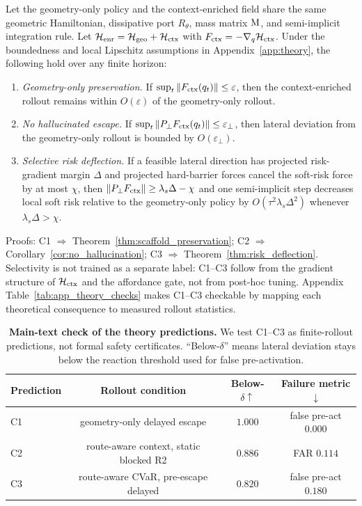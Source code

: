 \begin{proposition}
\label{prop:enrichment}
Let the geometry-only policy and the context-enriched field share the same geometric Hamiltonian, dissipative
port $R_\theta$, mass matrix $\mathrm{M}$, and semi-implicit integration rule.  Let
$\mathcal{H}_{\rm enr}=\mathcal{H}_{\rm geo}+\mathcal{H}_{\rm ctx}$ with
$F_{\rm ctx}=-\nabla_q\mathcal{H}_{\rm ctx}$.  Under the boundedness and local
Lipschitz assumptions in Appendix~\ref{app:theory}, the following hold over
any finite horizon:
\begin{enumerate}
  \item[\textbf{C1.}] \emph{Geometry-only preservation.} If
  $\sup_t\|F_{\rm ctx}(q_t)\|\le\varepsilon$, then the context-enriched rollout remains
  within $O(\varepsilon)$ of the geometry-only rollout.
  \item[\textbf{C2.}] \emph{No hallucinated escape.} If
  $\sup_t\|P_\perp F_{\rm ctx}(q_t)\|\le\varepsilon_\perp$, then lateral
  deviation from the geometry-only rollout is bounded by $O(\varepsilon_\perp)$.
  \item[\textbf{C3.}] \emph{Selective risk deflection.} If a feasible lateral
  direction has projected risk-gradient margin $\Delta$ and projected
  hard-barrier forces cancel the soft-risk force by at most $\chi$, then
  $\|P_\perp F_{\rm ctx}\|\ge\lambda_s\Delta-\chi$ and one semi-implicit step
  decreases local soft risk relative to the geometry-only policy by
  $O(\tau^2\lambda_s\Delta^2)$ whenever $\lambda_s\Delta>\chi$.
\end{enumerate}
\end{proposition}

Proofs: C1 $\Rightarrow$ Theorem~\ref{thm:scaffold_preservation};
C2 $\Rightarrow$ Corollary~\ref{cor:no_hallucination};
C3 $\Rightarrow$ Theorem~\ref{thm:risk_deflection}.  Selectivity is not
trained as a separate label: C1--C3 follow from the gradient structure of
$\mathcal{H}_{\rm ctx}$ and the affordance gate, not from post-hoc tuning. Appendix
Table~\ref{tab:app_theory_checks} makes C1--C3 checkable by mapping each
theoretical consequence to measured rollout statistics.

\begin{table}[t]
\centering
\caption{\textbf{Main-text check of the theory predictions.}
We test C1--C3 as finite-rollout predictions, not formal safety certificates.
``Below-$\delta$'' means lateral deviation stays below the reaction threshold
used for false pre-activation.}
\label{tab:main_theory_checks}
\small
\setlength{\tabcolsep}{4pt}
\renewcommand{\arraystretch}{1.06}
\begin{tabular}{lccc}
\toprule
Prediction & Rollout condition & Below-$\delta \uparrow$ & Failure metric$\downarrow$ \\
\midrule
C1 & geometry-only delayed escape
& $1.000$ & false pre-act $0.000$ \\
C2 & route-aware context, static blocked R2
& $0.886$ & FAR $0.114$ \\
C3 & route-aware CVaR, pre-escape delayed
& $0.820$ & false pre-act $0.180$ \\
\bottomrule
\end{tabular}
\end{table}
